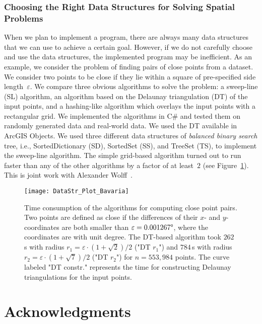\subsubsection{Choosing the Right Data Structures 
	for Solving Spatial Problems}

When we plan to implement a program, 
there are always many data structures that
we can use to achieve a certain goal.
However, if we do not carefully choose and use 
the data structures,
the implemented program may be inefficient.
As an example, we consider the problem of 
finding pairs of close points from a dataset. 
We consider two points to be close 
if they lie within a square of pre-specified 
side length~$\varepsilon$. 
We compare three obvious algorithms to solve the problem: 
a sweep-line (SL) algorithm, 
an algorithm based on the Delaunay triangulation (DT) 
of the input points, 
and a hashing-like algorithm 
which overlays the input points with a rectangular grid. 
We implemented the algorithms in C\# and tested them on 
randomly generated data and real-world data. 
We used the DT available in ArcGIS Objects. 
We used three different data structures
of \emph{balanced binary search} tree, 
i.e., SortedDictionary (SD), SortedSet (SS), and TreeSet (TS), 
to implement the sweep-line algorithm. 
The simple grid-based algorithm turned out to run faster than 
any of the other algorithms by a factor of at least~$2$ 
(see Figure~\ref{fig:Intro_DataStructure}).
This is joint work with 
Alexander Wolff~\parencite[see][]{Peng2014DataStr}.


\begin{figure}[tb]
\centering
\texttt{[image: DataStr\_Plot\_Bavaria]}
\caption{Time consumption of the algorithms
	for computing close point pairs. 
	Two points are defined as close if the differences 
	of their $x$- and $y$- coordinates are both smaller than
	$\varepsilon=0.001267 \degree$,
	where the coordinates are with unit degree. 
	The DT-based algorithm took $262\,$s 
	with radius $r_1=\varepsilon \cdot (1+\sqrt{2})/2$ 
	("DT $r_1$") and $784\,$s 
	with radius $r_2=\varepsilon \cdot (1+\sqrt{7})/2$ 
	("DT $r_2$") for $n=553{,}984$ points.
	The curve labeled "DT constr." represents 
	the time for constructing 
	Delaunay triangulations for the input points.
}
\label{fig:Intro_DataStructure}
\end{figure}


\section{Acknowledgments}

